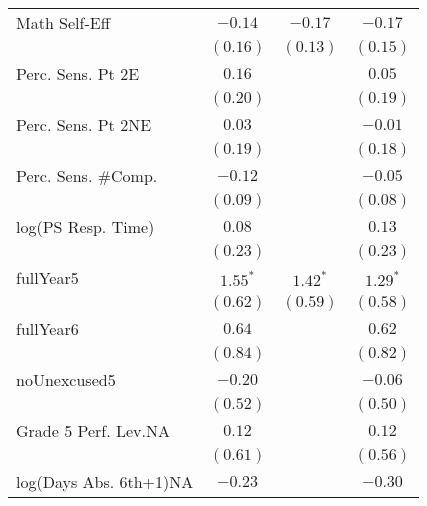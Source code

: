 \begin{center}
\begin{longtable}{l c c c}
Math Self-Eff                             & $-0.14$      & $-0.17$       & $-0.17$      \\
                                                   & $(0.16)$     & $(0.13)$      & $(0.15)$     \\
Perc. Sens. Pt 2E                             & $0.16$       &               & $0.05$       \\
                                                   & $(0.20)$     &               & $(0.19)$     \\
Perc. Sens. Pt 2NE                            & $0.03$       &               & $-0.01$      \\
                                                   & $(0.19)$     &               & $(0.18)$     \\
Perc. Sens. \#Comp.                            & $-0.12$      &               & $-0.05$      \\
                                                   & $(0.09)$     &               & $(0.08)$     \\
log(PS Resp. Time)                            & $0.08$       &               & $0.13$       \\
                                                   & $(0.23)$     &               & $(0.23)$     \\
fullYear5                                          & $1.55^{*}$   & $1.42^{*}$    & $1.29^{*}$   \\
                                                   & $(0.62)$     & $(0.59)$      & $(0.58)$     \\
fullYear6                                          & $0.64$       &               & $0.62$       \\
                                                   & $(0.84)$     &               & $(0.82)$     \\
noUnexcused5                                       & $-0.20$      &               & $-0.06$      \\
                                                   & $(0.52)$     &               & $(0.50)$     \\
Grade 5 Perf. Lev.NA                               & $0.12$       &               & $0.12$       \\
                                                   & $(0.61)$     &               & $(0.56)$     \\
log(Days Abs. 6th+1)NA                                      & $-0.23$      &               & $-0.30$      \\

\end{longtable}
\end{center}
